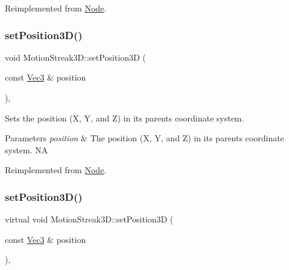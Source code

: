 Reimplemented from \hyperlink{classNode_aaa8545c103ef1b35e5076dbedab93af5}{Node}.

\mbox{\label{classMotionStreak3D_a0a0d2f5f302ecaecb2e6652e5863f28f}} 
\subsubsection{\texorpdfstring{set\+Position3\+D()}{setPosition3D()}\hspace{0.1cm}{\footnotesize\ttfamily [1/2]}}
{\footnotesize\ttfamily void Motion\+Streak3\+D\+::set\+Position3D (\begin{DoxyParamCaption}\item[{const \hyperlink{classVec3}{Vec3} \&}]{position }\end{DoxyParamCaption})\hspace{0.3cm}{\ttfamily [override]}, {\ttfamily [virtual]}}

Sets the position (X, Y, and Z) in its parent\textquotesingle{}s coordinate system.


\begin{DoxyParams}{Parameters}
{\em position} & The position (X, Y, and Z) in its parent\textquotesingle{}s coordinate system.  NA \\
\hline
\end{DoxyParams}


Reimplemented from \hyperlink{classNode_aa9eee02836d359b1469cf8a1484b485f}{Node}.

\mbox{\label{classMotionStreak3D_a34fac2c60502d074f8e40e99d01d9180}} 
\subsubsection{\texorpdfstring{set\+Position3\+D()}{setPosition3D()}\hspace{0.1cm}{\footnotesize\ttfamily [2/2]}}
{\footnotesize\ttfamily virtual void Motion\+Streak3\+D\+::set\+Position3D (\begin{DoxyParamCaption}\item[{const \hyperlink{classVec3}{Vec3} \&}]{position }\end{DoxyParamCaption})\hspace{0.3cm}{\ttfamily [override]}, {\ttfamily [virtual]}}

